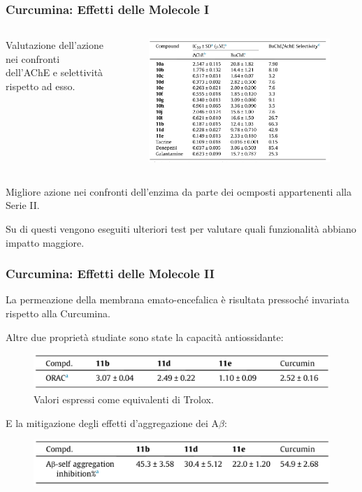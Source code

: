 \documentclass[9pt]{beamer}
\begin{document}
\begin{frame}
	\frametitle{Curcumina: Effetti delle Molecole I}
	\begin{columns}
		\begin{column}{.4\textwidth}
			Valutazione dell'azione nei confronti dell'AChE e selettività rispetto ad esso.
		\end{column}
		\begin{column}{.6\textwidth}
			\begin{figure}
				\includegraphics[width=\textwidth]{immagini/tabellacomposti_curcdone.png}
			\end{figure}
		\end{column}
	\end{columns}
	\bigskip
	Migliore azione nei confronti dell'enzima da parte dei ocmposti appartenenti alla Serie II.

	Su di questi vengono eseguiti ulteriori test per valutare quali funzionalità abbiano impatto maggiore.
\end{frame}

\begin{frame}
	\frametitle{Curcumina: Effetti delle Molecole II}
	La permeazione della membrana emato-encefalica è risultata pressoché invariata rispetto alla Curcumina.

Altre due proprietà studiate sono state la capacità antiossidante:
\begin{figure}
	\includegraphics{immagini/roi_curcdone.png}
	{\caption*{\footnotesize{Valori espressi come equivalenti di Trolox.}}}
\end{figure}

E la mitigazione degli effetti d'aggregazione dei A$\beta$:
\begin{figure}
	\includegraphics{immagini/selfab_curcdone.png}
\end{figure}
\end{frame}
\end{document}
